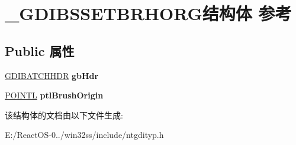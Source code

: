 \hypertarget{struct___g_d_i_b_s_s_e_t_b_r_h_o_r_g}{}\section{\+\_\+\+G\+D\+I\+B\+S\+S\+E\+T\+B\+R\+H\+O\+R\+G结构体 参考}
\label{struct___g_d_i_b_s_s_e_t_b_r_h_o_r_g}
\subsection*{Public 属性}
\begin{DoxyCompactItemize}
\item 
\mbox{\label{struct___g_d_i_b_s_s_e_t_b_r_h_o_r_g_a454b129879f25c571d49092c8ce06150}} 
\hyperlink{struct___g_d_i_b_a_t_c_h_h_d_r}{G\+D\+I\+B\+A\+T\+C\+H\+H\+DR} {\bfseries gb\+Hdr}
\item 
\mbox{\label{struct___g_d_i_b_s_s_e_t_b_r_h_o_r_g_ad487dfc8ee73c1c346d3485adf7d9414}} 
\hyperlink{struct___p_o_i_n_t_l}{P\+O\+I\+N\+TL} {\bfseries ptl\+Brush\+Origin}
\end{DoxyCompactItemize}


该结构体的文档由以下文件生成\+:\begin{DoxyCompactItemize}
\item 
E\+:/\+React\+O\+S-\/0../win32ss/include/ntgdityp.\+h\end{DoxyCompactItemize}
